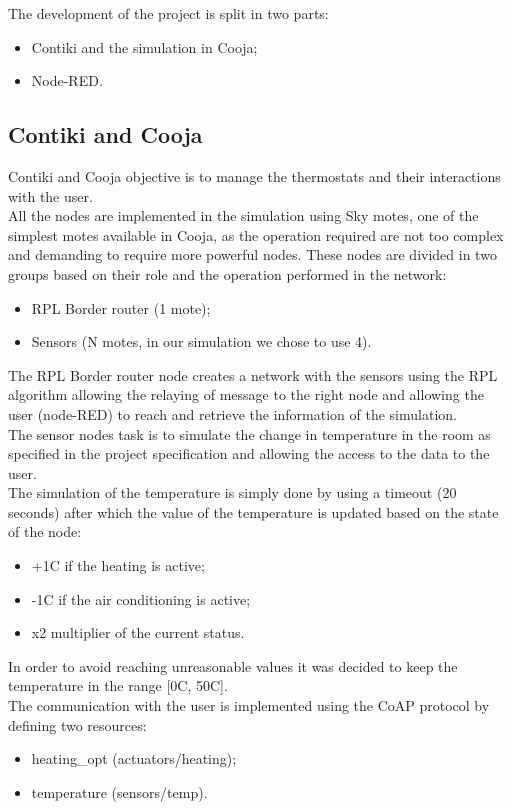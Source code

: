 The development of the project is split in two parts:
\begin{itemize}
	\item Contiki and the simulation in Cooja;
	\item Node-RED.
\end{itemize}

\subsection*{Contiki and Cooja}
Contiki and Cooja objective is to manage the thermostats and their interactions with the user.\\
All the nodes are implemented in the simulation using Sky motes, one of the simplest motes available in Cooja, as the operation required are not too complex and demanding to require more powerful nodes. These nodes are divided in two groups based on their role and the operation performed in the network:
\begin{itemize}
	\item RPL Border router (1 mote);
	\item Sensors (N motes, in our simulation we chose to use 4).
\end{itemize}

The RPL Border router node creates a network with the sensors using the RPL algorithm allowing the relaying of message to the right node and allowing the user (node-RED) to reach and retrieve the information of the simulation.\\

The sensor nodes task is to simulate the change in temperature in the room as specified in the project specification and allowing the access to the data to the user.\\
The simulation of the temperature is simply done by using a timeout (20 seconds) after which the value of the temperature is updated based on the state of the node:
\begin{itemize}
	\item +1\textdegree C if the heating is active;
	\item -1\textdegree C if the air conditioning is active;
	\item x2 multiplier of the current status.
\end{itemize} 
In order to avoid reaching unreasonable values it was decided to keep the temperature in the range [0\textdegree C, 50\textdegree C].\\
The communication with the user is implemented using the CoAP protocol by defining two resources:
\begin{itemize}
	\item heating\_opt (actuators/heating);
	\item temperature (sensors/temp).
\end{itemize}

